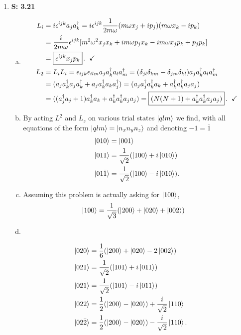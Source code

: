 \documentclass[12pt, letterpaper]{article}
\newcommand{\minus}[1]{\bar{#1}}
\begin{document}
\begin{enumerate}
    
    \item[] \textbf{S: 3.21}
    
\begin{enumerate}[(a)]
\item 
\begin{align}
L_i &= i\epsilon^{ijk}a_j a_k^\dag = i\epsilon^{ijk}\frac{1}{2
    m\omega}(m\omega x_j + ip_j)(m\omega x_k - ip_k)\\
&= \frac{i}{2m\omega}\epsilon^{ijk}[m^2\omega^2x_jx_k+im\omega p_jx_k
    -im\omega x_jp_k+ p_jp_k]\\
&= \boxed{\epsilon^{ijk}x_jp_k}\hspace{.5mm}. \hspace{2mm}\checkmark\\
L_2 &= L_iL_i = \epsilon_{ijk}\epsilon_{ilm}a_ja_k^\dag a_la_m^\dag
    = (\delta_{jl}\delta_{km}-\delta_{jm}\delta_{kl})a_ja_k^\dag a_la_m^\dag\\
&= (a_ja_k^\dag a_ja_k^\dag + a_ja_k^\dag a_ka_j^\dag)
    = (a_ja_j^\dag a_k^\dag a_k + a_k^\dag a_k^\dag a_ja_j)\\
&= ((a_j^\dag a_j +1)a_k^\dag a_k + a_k^\dag a_k^\dag a_ja_j) = 
    \boxed{(N(N +1) + a_k^\dag a_k^\dag a_ja_j)}\hspace{.5mm}. \hspace{2mm}\checkmark
\end{align}
\item 
By acting $L^2$ and $L_z$ on various trial states $\ket{qlm}$ we find, with all equations of the form $\ket{qlm} = \ket{n_xn_yn_z}$ and denoting $-1 = \minus{1}$
\begin{align}
\ket{010} &= \ket{001}\\
\ket{011} &= \frac{1}{\sqrt{2}}(\ket{100}+ i\ket{010})\\
\ket{01\minus{1}} &= \frac{1}{\sqrt{2}}(\ket{100}- i\ket{010}).
\end{align}
\item 
Assuming this problem is actually asking for $\ket{100}$, 
\begin{align}
\ket{100} &= \frac{1}{\sqrt{3}}(\ket{200}+\ket{020}+\ket{002})
\end{align}
\item 
\end{enumerate}
\begin{align}
\ket{020} &= \frac{1}{6}(\ket{200}+\ket{020}-2\ket{002})\\
\ket{021} &= \frac{1}{\sqrt{2}}(\ket{101}+i\ket{011})\\
\ket{02\bar{1}} &= \frac{1}{\sqrt{2}}(\ket{101}-i\ket{011})\\
\ket{022} &= \frac{1}{2}(\ket{200}-\ket{020})+\frac{i}{\sqrt{2}}\ket{110}\\
\ket{02\bar{2}} &= \frac{1}{2}(\ket{200}-\ket{020})-\frac{i}{\sqrt{2}}\ket{110}.
\end{align}


\end{enumerate}
\end{document}

